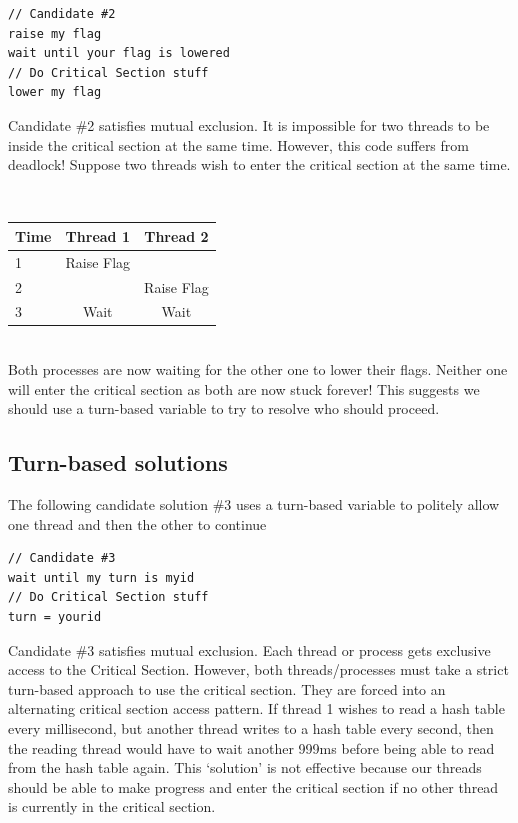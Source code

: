 \begin{lstlisting}
// Candidate #2
raise my flag
wait until your flag is lowered
// Do Critical Section stuff
lower my flag
\end{lstlisting}

Candidate \#2 satisfies mutual exclusion.
It is impossible for two threads to be inside the critical section at the same time.
However, this code suffers from deadlock!
Suppose two threads wish to enter the critical section at the same time.

\\
\begin{center}
\begin{tabular}{|l|c|c|}
Time & Thread 1 & Thread 2 \\ \hline
1 & Raise Flag & \\
2 & & Raise Flag \\
3 & Wait & Wait \\
\end{tabular}
\end{center}
\\

Both processes are now waiting for the other one to lower their flags.
Neither one will enter the critical section as both are now stuck forever!
This suggests we should use a turn-based variable to try to resolve who should proceed.

\subsection{Turn-based solutions}

The following candidate solution \#3 uses a turn-based variable to politely allow one thread and then the other to continue

\begin{lstlisting}
// Candidate #3
wait until my turn is myid
// Do Critical Section stuff
turn = yourid
\end{lstlisting}

Candidate \#3 satisfies mutual exclusion.
Each thread or process gets exclusive access to the Critical Section.
However, both threads/processes must take a strict turn-based approach to use the critical section.
They are forced into an alternating critical section access pattern.
If thread 1 wishes to read a hash table every millisecond, but another thread writes to a hash table every second, then the reading thread would have to wait another 999ms before being able to read from the hash table again.
This `solution' is not effective because our threads should be able to make progress and enter the critical section if no other thread is currently in the critical section.

